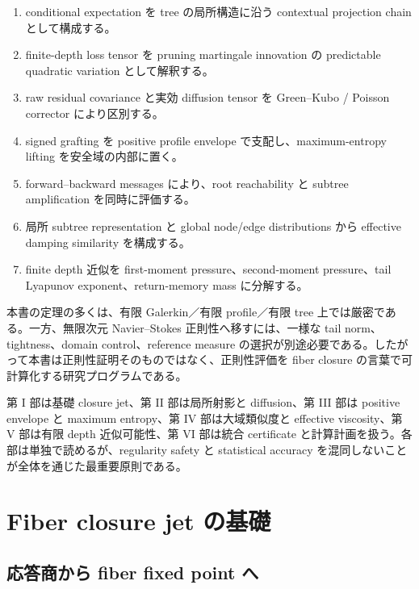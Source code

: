 \documentclass[11pt,a4paper,openany]{book}
\numberwithin{equation}{chapter}
\begin{document}
\begin{enumerate}
\item conditional expectation を tree の局所構造に沿う contextual projection chain として構成する。
\item finite-depth loss tensor を pruning martingale innovation の predictable quadratic variation として解釈する。
\item raw residual covariance と実効 diffusion tensor を Green--Kubo / Poisson corrector により区別する。
\item signed grafting を positive profile envelope で支配し、maximum-entropy lifting を安全域の内部に置く。
\item forward--backward messages により、root reachability と subtree amplification を同時に評価する。
\item 局所 subtree representation と global node/edge distributions から effective damping similarity を構成する。
\item finite depth 近似を first-moment pressure、second-moment pressure、tail Lyapunov exponent、return-memory mass に分解する。
\end{enumerate}

本書の定理の多くは、有限 Galerkin／有限 profile／有限 tree 上では厳密である。一方、無限次元 Navier--Stokes 正則性へ移すには、一様な tail norm、tightness、domain control、reference measure の選択が別途必要である。したがって本書は正則性証明そのものではなく、正則性評価を fiber closure の言葉で可計算化する研究プログラムである。

\begin{tcolorbox}[colback=softgold,colframe=deepgold,boxrule=0.55pt,arc=1mm,title={読み方}]
第 I 部は基礎 closure jet、第 II 部は局所射影と diffusion、第 III 部は positive envelope と maximum entropy、第 IV 部は大域類似度と effective viscosity、第 V 部は有限 depth 近似可能性、第 VI 部は統合 certificate と計算計画を扱う。各部は単独で読めるが、regularity safety と statistical accuracy を混同しないことが全体を通じた最重要原則である。
\end{tcolorbox}

\tableofcontents
\mainmatter
\part{Fiber closure jet の基礎}

\chapter{応答商から fiber fixed point へ}
\end{document}
